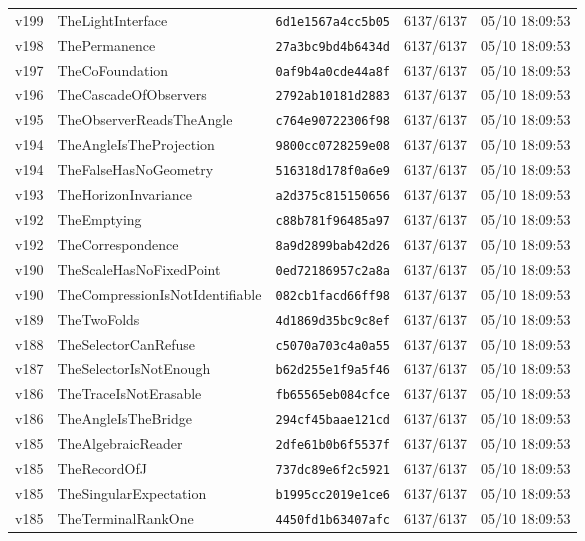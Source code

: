 \documentclass[11pt]{article}
\theoremstyle{definition}\newtheorem{deriv}{Derivação}
\begin{document}
{\begin{longtable}{@{}lllll@{}}
v199 & TheLightInterface & \texttt{6d1e1567a4cc5b05} & 6137/6137 & 05/10 18:09:53 \\
v198 & ThePermanence & \texttt{27a3bc9bd4b6434d} & 6137/6137 & 05/10 18:09:53 \\
v197 & TheCoFoundation & \texttt{0af9b4a0cde44a8f} & 6137/6137 & 05/10 18:09:53 \\
v196 & TheCascadeOfObservers & \texttt{2792ab10181d2883} & 6137/6137 & 05/10 18:09:53 \\
v195 & TheObserverReadsTheAngle & \texttt{c764e90722306f98} & 6137/6137 & 05/10 18:09:53 \\
v194 & TheAngleIsTheProjection & \texttt{9800cc0728259e08} & 6137/6137 & 05/10 18:09:53 \\
v194 & TheFalseHasNoGeometry & \texttt{516318d178f0a6e9} & 6137/6137 & 05/10 18:09:53 \\
v193 & TheHorizonInvariance & \texttt{a2d375c815150656} & 6137/6137 & 05/10 18:09:53 \\
v192 & TheEmptying & \texttt{c88b781f96485a97} & 6137/6137 & 05/10 18:09:53 \\
v192 & TheCorrespondence & \texttt{8a9d2899bab42d26} & 6137/6137 & 05/10 18:09:53 \\
v190 & TheScaleHasNoFixedPoint & \texttt{0ed72186957c2a8a} & 6137/6137 & 05/10 18:09:53 \\
v190 & TheCompressionIsNotIdentifiable & \texttt{082cb1facd66ff98} & 6137/6137 & 05/10 18:09:53 \\
v189 & TheTwoFolds & \texttt{4d1869d35bc9c8ef} & 6137/6137 & 05/10 18:09:53 \\
v188 & TheSelectorCanRefuse & \texttt{c5070a703c4a0a55} & 6137/6137 & 05/10 18:09:53 \\
v187 & TheSelectorIsNotEnough & \texttt{b62d255e1f9a5f46} & 6137/6137 & 05/10 18:09:53 \\
v186 & TheTraceIsNotErasable & \texttt{fb65565eb084cfce} & 6137/6137 & 05/10 18:09:53 \\
v186 & TheAngleIsTheBridge & \texttt{294cf45baae121cd} & 6137/6137 & 05/10 18:09:53 \\
v185 & TheAlgebraicReader & \texttt{2dfe61b0b6f5537f} & 6137/6137 & 05/10 18:09:53 \\
v185 & TheRecordOfJ & \texttt{737dc89e6f2c5921} & 6137/6137 & 05/10 18:09:53 \\
v185 & TheSingularExpectation & \texttt{b1995cc2019e1ce6} & 6137/6137 & 05/10 18:09:53 \\
v185 & TheTerminalRankOne & \texttt{4450fd1b63407afc} & 6137/6137 & 05/10 18:09:53 \\

\end{longtable}}
\end{document}
